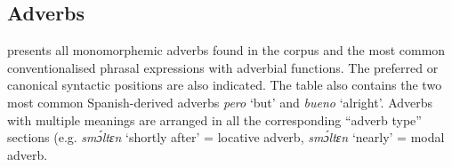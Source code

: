 \subsection{Adverbs}\label{sec:7.7.1}

 presents all monomorphemic adverbs found in the corpus and the most common conventionalised phrasal expressions with adverbial functions. The preferred or canonical syntactic positions are also indicated. The table also contains the two most common Spanish-derived adverbs \textit{pero} ‘but’ and \textit{bueno} ‘alright’. Adverbs with multiple meanings are arranged in all the corresponding “adverb type” sections (e.g. \textit{smɔ́ltɛn} ‘shortly after’ = locative adverb, \textit{smɔ́ltɛn} ‘nearly’ = modal adverb.

